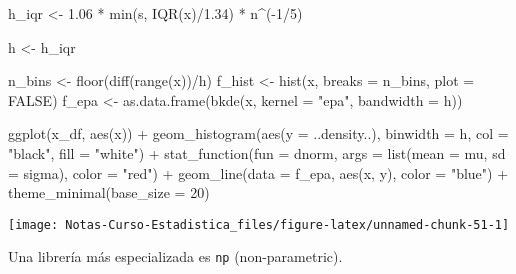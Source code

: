 \documentclass[
  12pt,
]{book}
\newenvironment{Shaded}{\begin{snugshade}}{\end{snugshade}}
\newcommand{\AttributeTok}[1]{\textcolor[rgb]{0.77,0.63,0.00}{#1}}
\newcommand{\ConstantTok}[1]{\textcolor[rgb]{0.00,0.00,0.00}{#1}}
\newcommand{\DecValTok}[1]{\textcolor[rgb]{0.00,0.00,0.81}{#1}}
\newcommand{\FloatTok}[1]{\textcolor[rgb]{0.00,0.00,0.81}{#1}}
\newcommand{\FunctionTok}[1]{\textcolor[rgb]{0.00,0.00,0.00}{#1}}
\newcommand{\NormalTok}[1]{#1}
\newcommand{\OtherTok}[1]{\textcolor[rgb]{0.56,0.35,0.01}{#1}}
\newcommand{\SpecialCharTok}[1]{\textcolor[rgb]{0.00,0.00,0.00}{#1}}
\newcommand{\StringTok}[1]{\textcolor[rgb]{0.31,0.60,0.02}{#1}}
\theoremstyle{definition}
\theoremstyle{definition}
\theoremstyle{definition}
\theoremstyle{definition}
\theoremstyle{remark}
\begin{document}
\begin{Shaded}
\begin{Highlighting}[]
\NormalTok{h\_iqr }\OtherTok{\textless{}{-}} \FloatTok{1.06} \SpecialCharTok{*} \FunctionTok{min}\NormalTok{(s, }\FunctionTok{IQR}\NormalTok{(x)}\SpecialCharTok{/}\FloatTok{1.34}\NormalTok{) }\SpecialCharTok{*}\NormalTok{ n}\SpecialCharTok{\^{}}\NormalTok{(}\SpecialCharTok{{-}}\DecValTok{1}\SpecialCharTok{/}\DecValTok{5}\NormalTok{)}

\NormalTok{h }\OtherTok{\textless{}{-}}\NormalTok{ h\_iqr}

\NormalTok{n\_bins }\OtherTok{\textless{}{-}} \FunctionTok{floor}\NormalTok{(}\FunctionTok{diff}\NormalTok{(}\FunctionTok{range}\NormalTok{(x))}\SpecialCharTok{/}\NormalTok{h)}
\NormalTok{f\_hist }\OtherTok{\textless{}{-}} \FunctionTok{hist}\NormalTok{(x, }\AttributeTok{breaks =}\NormalTok{ n\_bins, }\AttributeTok{plot =} \ConstantTok{FALSE}\NormalTok{)}
\NormalTok{f\_epa }\OtherTok{\textless{}{-}} \FunctionTok{as.data.frame}\NormalTok{(}\FunctionTok{bkde}\NormalTok{(x, }\AttributeTok{kernel =} \StringTok{"epa"}\NormalTok{, }\AttributeTok{bandwidth =}\NormalTok{ h))}

\FunctionTok{ggplot}\NormalTok{(x\_df, }\FunctionTok{aes}\NormalTok{(x)) }\SpecialCharTok{+} \FunctionTok{geom\_histogram}\NormalTok{(}\FunctionTok{aes}\NormalTok{(}\AttributeTok{y =}\NormalTok{ ..density..),}
    \AttributeTok{binwidth =}\NormalTok{ h, }\AttributeTok{col =} \StringTok{"black"}\NormalTok{, }\AttributeTok{fill =} \StringTok{"white"}\NormalTok{) }\SpecialCharTok{+}
    \FunctionTok{stat\_function}\NormalTok{(}\AttributeTok{fun =}\NormalTok{ dnorm, }\AttributeTok{args =} \FunctionTok{list}\NormalTok{(}\AttributeTok{mean =}\NormalTok{ mu,}
        \AttributeTok{sd =}\NormalTok{ sigma), }\AttributeTok{color =} \StringTok{"red"}\NormalTok{) }\SpecialCharTok{+} \FunctionTok{geom\_line}\NormalTok{(}\AttributeTok{data =}\NormalTok{ f\_epa,}
    \FunctionTok{aes}\NormalTok{(x, y), }\AttributeTok{color =} \StringTok{"blue"}\NormalTok{) }\SpecialCharTok{+} \FunctionTok{theme\_minimal}\NormalTok{(}\AttributeTok{base\_size =} \DecValTok{20}\NormalTok{)}
\end{Highlighting}
\end{Shaded}

\begin{center}\texttt{[image: Notas-Curso-Estadistica\_files/figure-latex/unnamed-chunk-51-1]} \end{center}

Una librería más especializada es \texttt{np} (non-parametric).
\end{document}
